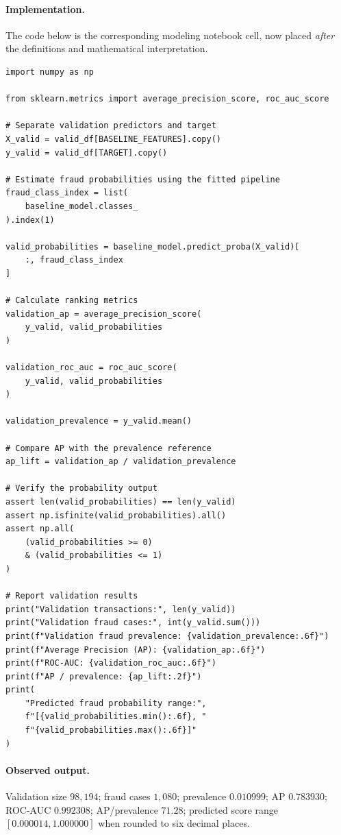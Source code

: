 \documentclass[11pt,a4paper]{article}
\begin{document}
\paragraph{Implementation.} The code below is the corresponding modeling notebook cell, now placed \emph{after} the definitions and mathematical interpretation.
\begin{lstlisting}
import numpy as np

from sklearn.metrics import average_precision_score, roc_auc_score

# Separate validation predictors and target
X_valid = valid_df[BASELINE_FEATURES].copy()
y_valid = valid_df[TARGET].copy()

# Estimate fraud probabilities using the fitted pipeline
fraud_class_index = list(
    baseline_model.classes_
).index(1)

valid_probabilities = baseline_model.predict_proba(X_valid)[
    :, fraud_class_index
]

# Calculate ranking metrics
validation_ap = average_precision_score(
    y_valid, valid_probabilities
)

validation_roc_auc = roc_auc_score(
    y_valid, valid_probabilities
)

validation_prevalence = y_valid.mean()

# Compare AP with the prevalence reference
ap_lift = validation_ap / validation_prevalence

# Verify the probability output
assert len(valid_probabilities) == len(y_valid)
assert np.isfinite(valid_probabilities).all()
assert np.all(
    (valid_probabilities >= 0)
    & (valid_probabilities <= 1)
)

# Report validation results
print("Validation transactions:", len(y_valid))
print("Validation fraud cases:", int(y_valid.sum()))
print(f"Validation fraud prevalence: {validation_prevalence:.6f}")
print(f"Average Precision (AP): {validation_ap:.6f}")
print(f"ROC-AUC: {validation_roc_auc:.6f}")
print(f"AP / prevalence: {ap_lift:.2f}")
print(
    "Predicted fraud probability range:",
    f"[{valid_probabilities.min():.6f}, "
    f"{valid_probabilities.max():.6f}]"
)
\end{lstlisting}
\paragraph{Observed output.} Validation size $98{,}194$; fraud cases $1{,}080$; prevalence $0.010999$; AP $0.783930$; ROC-AUC $0.992308$; AP/prevalence $71.28$; predicted score range $[0.000014,1.000000]$ when rounded to six decimal places.
\end{document}
